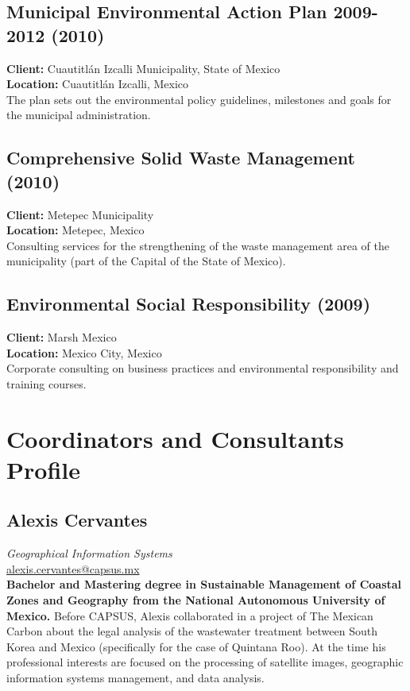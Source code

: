 \documentclass[
	a4paper,
	12pt,
	unnumberedsections,
]{CSSullivanBusinessReport}
\begin{document}
\subsection{Municipal Environmental Action Plan 2009-2012 (2010)}
\textbf{Client:}  Cuautitlán Izcalli Municipality, State of Mexico \\
\textbf{Location:}  Cuautitlán Izcalli, Mexico \\[0.5em]
 The plan sets out the environmental policy guidelines, milestones and goals for the municipal administration.

\subsection{Comprehensive Solid Waste Management (2010)}
\textbf{Client:}  Metepec Municipality \\
\textbf{Location:}  Metepec, Mexico \\[0.5em]
 Consulting services for the strengthening of the waste management area of the municipality (part of the Capital of the State of Mexico).

\subsection{Environmental Social Responsibility (2009)}
\textbf{Client:}  Marsh Mexico \\
\textbf{Location:}  Mexico City, Mexico \\[0.5em]
 Corporate consulting on business practices and environmental responsibility and training courses.

\section{Coordinators and Consultants Profile}
\subsection*{Alexis Cervantes}
\textit{Geographical Information Systems} \\
\href{mailto:alexis.cervantes@capsus.mx}{alexis.cervantes@capsus.mx} \\[0.5em]
\textbf{Bachelor and Mastering degree in Sustainable Management of Coastal Zones and Geography from the National Autonomous University of Mexico.} Before CAPSUS, Alexis collaborated in a project of The Mexican Carbon about the legal analysis of the wastewater treatment between South Korea and Mexico (specifically for the case of Quintana Roo). At the time his professional interests are focused on the processing of satellite images, geographic information systems management, and data analysis.
\end{document}
